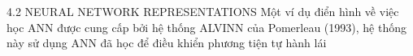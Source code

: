 4.2 NEURAL NETWORK REPRESENTATIONS Một ví dụ điển hình về việc học ANN được cung cấp bởi hệ thống ALVINN của Pomerleau (1993), hệ thống này sử dụng ANN đã học để điều khiển phương tiện tự hành lái

